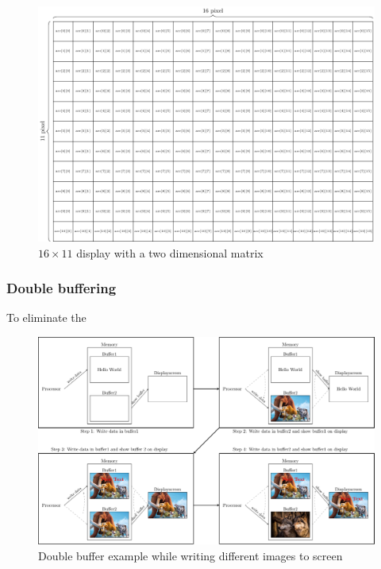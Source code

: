 \begin{figure}[H]
	\centering
	\includegraphics[width=1\textwidth]{2-theory/drawing-graphics/graphics/matrix2.pdf}
	\caption{$16\times 11$ display with a two dimensional matrix\label{theory:matrix2}}
\end{figure}

\subsubsection{Double buffering}

To eliminate the 
  

\begin{figure}[H]
	\centering
	\includegraphics[width=1\textwidth]{2-theory/drawing-graphics/graphics/buffer.pdf}
	\caption{Double buffer example while writing different images to screen\label{theory:buffer}}
\end{figure}




